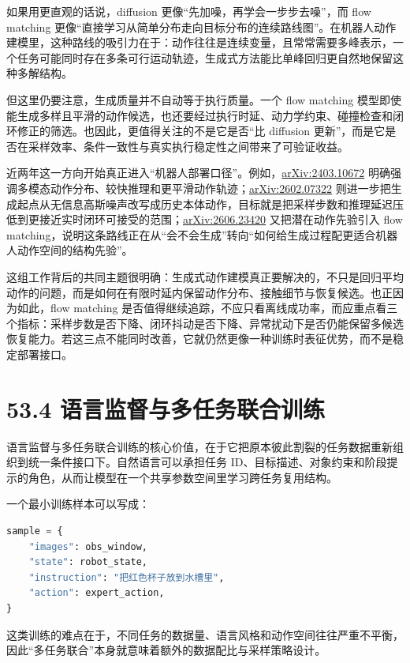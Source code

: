 如果用更直观的话说，diffusion 更像“先加噪，再学会一步步去噪”，而 flow matching 更像“直接学习从简单分布走向目标分布的连续路线图”。在机器人动作建模里，这种路线的吸引力在于：动作往往是连续变量，且常常需要多峰表示，一个任务可能同时存在多条可行运动轨迹，生成式方法能比单峰回归更自然地保留这种多解结构。

但这里仍要注意，生成质量并不自动等于执行质量。一个 flow matching 模型即使能生成多样且平滑的动作候选，也还要经过执行时延、动力学约束、碰撞检查和闭环修正的筛选。也因此，更值得关注的不是它是否“比 diffusion 更新”，而是它是否在采样效率、条件一致性与真实执行稳定性之间带来了可验证收益。

近两年这一方向开始真正进入“机器人部署口径”。例如，\href{https://arxiv.org/abs/2403.10672}{arXiv:2403.10672} 明确强调多模态动作分布、较快推理和更平滑动作轨迹；\href{https://arxiv.org/abs/2602.07322}{arXiv:2602.07322} 则进一步把生成起点从无信息高斯噪声改写成历史本体动作，目标就是把采样步数和推理延迟压低到更接近实时闭环可接受的范围；\href{https://arxiv.org/abs/2606.23420}{arXiv:2606.23420} 又把潜在动作先验引入 flow matching，说明这条路线正在从“会不会生成”转向“如何给生成过程配更适合机器人动作空间的结构先验”。

这组工作背后的共同主题很明确：生成式动作建模真正要解决的，不只是回归平均动作的问题，而是如何在有限时延内保留动作分布、接触细节与恢复候选。也正因为如此，flow matching 是否值得继续追踪，不应只看离线成功率，而应重点看三个指标：采样步数是否下降、闭环抖动是否下降、异常扰动下是否仍能保留多候选恢复能力。若这三点不能同时改善，它就仍然更像一种训练时表征优势，而不是稳定部署接口。

\section*{53.4 语言监督与多任务联合训练}


语言监督与多任务联合训练的核心价值，在于它把原本彼此割裂的任务数据重新组织到统一条件接口下。自然语言可以承担任务 ID、目标描述、对象约束和阶段提示的角色，从而让模型在一个共享参数空间里学习跨任务复用结构。

一个最小训练样本可以写成：

\begin{lstlisting}[language=python]
sample = {
    "images": obs_window,
    "state": robot_state,
    "instruction": "把红色杯子放到水槽里",
    "action": expert_action,
}
\end{lstlisting}

这类训练的难点在于，不同任务的数据量、语言风格和动作空间往往严重不平衡，因此“多任务联合”本身就意味着额外的数据配比与采样策略设计。

